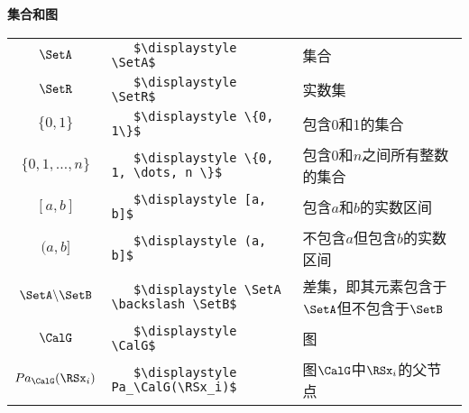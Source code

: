 \vspace{\notationgap}
\begin{minipage}{\textwidth}
\centerline{\bf 集合和图}
\bgroup
\def\arraystretch{1.5}
\begin{tabular}{clp{3.25in}}
$\displaystyle \SetA$ 					      &         	\lstinline!   $\displaystyle \SetA$ 				 !   & 集合 \\
$\displaystyle \SetR$ 					      &         	\lstinline!   $\displaystyle \SetR$ 				 !   & 实数集 \\
$\displaystyle \{0, 1\}$ 				      &         	\lstinline!   $\displaystyle \{0, 1\}$ 				 !   	& 包含0和1的集合 \\
$\displaystyle \{0, 1, \dots, n \}$ 		  &       	\lstinline!   $\displaystyle \{0, 1, \dots, n \}$ 		 !   		& 包含$0$和$n$之间所有整数的集合 \\
$\displaystyle [a, b]$ 					      &         	\lstinline!   $\displaystyle [a, b]$ 				 !   & 包含$a$和$b$的实数区间 \\
$\displaystyle (a, b]$ 					      &         	\lstinline!   $\displaystyle (a, b]$ 				 !   & 不包含$a$但包含$b$的实数区间 \\
$\displaystyle \SetA \backslash \SetB$ 	      &         	\lstinline!   $\displaystyle \SetA \backslash \SetB$  !   				& 差集，即其元素包含于$\SetA$但不包含于$\SetB$\\
$\displaystyle \CalG$ 					      &         	\lstinline!   $\displaystyle \CalG$ 				 !   & 图 \\
$\displaystyle Pa_\CalG(\RSx_i)$ 		      &         	\lstinline!   $\displaystyle Pa_\CalG(\RSx_i)$ 		 !   			& 图$\CalG$中$\RSx_i$的父节点
\end{tabular}
\egroup
\end{minipage}

